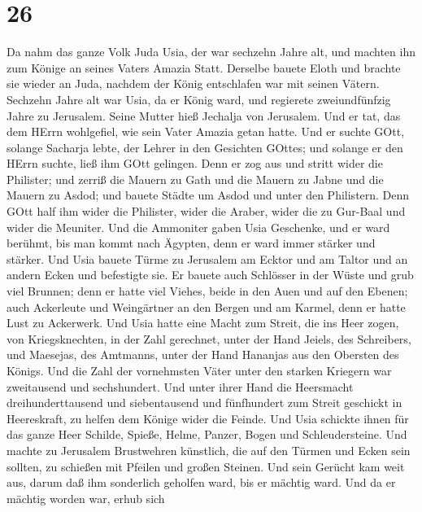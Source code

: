 \hypertarget{section-25}{%
\section{26}\label{section-25}}

 Da nahm das ganze Volk Juda Usia, der war sechzehn Jahre
alt, und machten ihn zum Könige an seines Vaters Amazia Statt.
 Derselbe bauete Eloth und brachte sie wieder an Juda,
nachdem der König entschlafen war mit seinen Vätern. 
Sechzehn Jahre alt war Usia, da er König ward, und regierete
zweiundfünfzig Jahre zu Jerusalem. Seine Mutter hieß Jechalja von
Jerusalem.  Und er tat, das dem HErrn wohlgefiel, wie sein
Vater Amazia getan hatte.  Und er suchte GOtt, solange
Sacharja lebte, der Lehrer in den Gesichten GOttes; und solange er den
HErrn suchte, ließ ihm GOtt gelingen.  Denn er zog aus und
stritt wider die Philister; und zerriß die Mauern zu Gath und die Mauern
zu Jabne und die Mauern zu Asdod; und bauete Städte um Asdod und unter
den Philistern.  Denn GOtt half ihm wider die Philister,
wider die Araber, wider die zu Gur-Baal und wider die Meuniter.
 Und die Ammoniter gaben Usia Geschenke, und er ward
berühmt, bis man kommt nach Ägypten, denn er ward immer stärker und
stärker.  Und Usia bauete Türme zu Jerusalem am Ecktor und
am Taltor und an andern Ecken und befestigte sie.  Er
bauete auch Schlösser in der Wüste und grub viel Brunnen; denn er hatte
viel Viehes, beide in den Auen und auf den Ebenen; auch Ackerleute und
Weingärtner an den Bergen und am Karmel, denn er hatte Lust zu
Ackerwerk.  Und Usia hatte eine Macht zum Streit, die ins
Heer zogen, von Kriegsknechten, in der Zahl gerechnet, unter der Hand
Jeiels, des Schreibers, und Maesejas, des Amtmanns, unter der Hand
Hananjas aus den Obersten des Königs.  Und die Zahl der
vornehmsten Väter unter den starken Kriegern war zweitausend und
sechshundert.  Und unter ihrer Hand die Heersmacht
dreihunderttausend und siebentausend und fünfhundert zum Streit
geschickt in Heereskraft, zu helfen dem Könige wider die Feinde.
 Und Usia schickte ihnen für das ganze Heer Schilde,
Spieße, Helme, Panzer, Bogen und Schleudersteine.  Und
machte zu Jerusalem Brustwehren künstlich, die auf den Türmen und Ecken
sein sollten, zu schießen mit Pfeilen und großen Steinen. Und sein
Gerücht kam weit aus, darum daß ihm sonderlich geholfen ward, bis er
mächtig ward.  Und da er mächtig worden war, erhub sich
